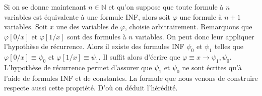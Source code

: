 \documentclass[a4paper,11pt]{article}
\begin{document}
		Si on se donne maintenant $n \in \mathbb{N}$ et qu'on suppose que toute formule à $n$ variables est équivalente à une formule INF, alors soit $\varphi$ une formule à $n+1$ variables. Soit $x$ une des variables de $\varphi$, choisie arbitrairement. Remarquons que $\varphi[0/x]$ et $\varphi[1/x]$ sont des formules à $n$ variables. On peut donc leur appliquer l'hypothèse de récurrence. Alors il existe des formules INF $\psi_0$ et $\psi_1$ telles que $\varphi[0/x] \equiv \psi_0$ et $\varphi[1/x] \equiv \psi_1$. Il suffit alors d'écrire que $\varphi \equiv x \rightarrow \psi_1, \psi_0$. L'hypothèse de récurrence permet d'assurer que $\psi_1$ et $\psi_0$ ne sont écrites qu'à l'aide de formules INF et de constantes. La formule que nous venons de construire respecte aussi cette propriété. D'où on déduit l'hérédité.
\end{document}
